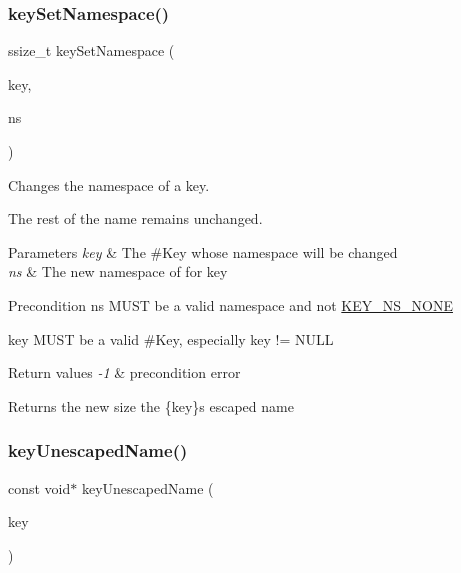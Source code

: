 \subsubsection{\texorpdfstring{key\+Set\+Namespace()}{keySetNamespace()}}
{\footnotesize\ttfamily ssize\+\_\+t key\+Set\+Namespace (\begin{DoxyParamCaption}\item[{Key $\ast$}]{key,  }\item[{\hyperlink{group__key_gaec3b8d6f430ae49b91bafe8a86310a68}{elektra\+Namespace}}]{ns }\end{DoxyParamCaption})}



Changes the namespace of a key. 

The rest of the name remains unchanged.


\begin{DoxyParams}{Parameters}
{\em key} & The \#\+Key whose namespace will be changed \\
\hline
{\em ns} & The new namespace of for {\ttfamily key} \\
\hline
\end{DoxyParams}
\begin{DoxyPrecond}{Precondition}
{\ttfamily ns} M\+U\+ST be a valid namespace and not \hyperlink{group__key_ggaec3b8d6f430ae49b91bafe8a86310a68a3659698b0a07454ca8055ab693e8efd1}{K\+E\+Y\+\_\+\+N\+S\+\_\+\+N\+O\+NE} 

{\ttfamily key} M\+U\+ST be a valid \#\+Key, especially {\ttfamily key != N\+U\+LL}
\end{DoxyPrecond}

\begin{DoxyRetVals}{Return values}
{\em -\/1} & precondition error \\
\hline
\end{DoxyRetVals}
\begin{DoxyReturn}{Returns}
the new size the {\ttfamily }\{key\}\textquotesingle{}s escaped name 
\end{DoxyReturn}
\mbox{\label{group__keyname_ga6fe6af4c27b35d911a533f4ae4d698bb}} 
\subsubsection{\texorpdfstring{key\+Unescaped\+Name()}{keyUnescapedName()}}
{\footnotesize\ttfamily const void$\ast$ key\+Unescaped\+Name (\begin{DoxyParamCaption}\item[{const Key $\ast$}]{key }\end{DoxyParamCaption})}



